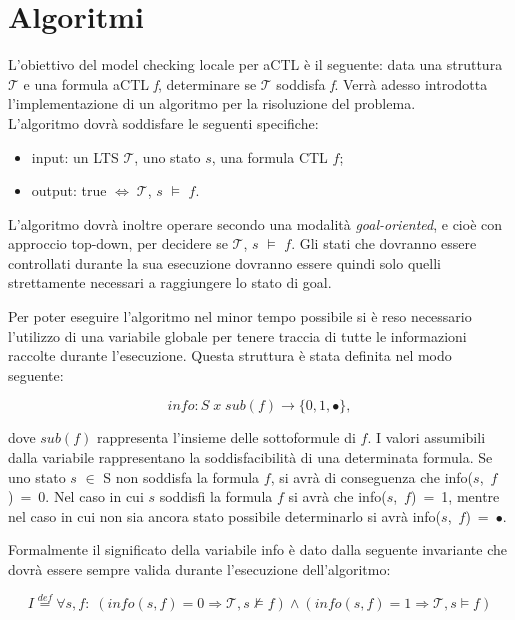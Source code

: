 \section{Algoritmi}

L'obiettivo del model checking locale per aCTL è il seguente: data una struttura $\mathcal{T}$ e una formula aCTL \emph{f},  determinare se $\mathcal{T}$ soddisfa \emph{f}.
Verrà adesso introdotta l'implementazione di un algoritmo per la risoluzione del problema.
\\

\noindent L'algoritmo dovrà soddisfare le seguenti specifiche:
\begin{itemize}
\item input: un LTS $\mathcal{T}$, uno stato $s$, una formula CTL $f$;
\item output: true $ \Leftrightarrow \; \mathcal{T}$, $s$ $\models$ $f$.
\end{itemize}
L'algoritmo dovrà inoltre operare secondo una modalità \textit{goal-oriented}, e cioè con approccio top-down, per decidere se $\mathcal{T}$, $s$ $\models$ $f$. Gli stati che dovranno essere controllati durante la sua esecuzione dovranno essere quindi solo quelli strettamente necessari a raggiungere lo stato di goal.


Per poter eseguire l'algoritmo nel minor tempo possibile si è reso necessario l'utilizzo di una variabile globale per tenere traccia di tutte le informazioni raccolte durante l'esecuzione.
Questa struttura è stata definita nel modo seguente:

\begin{equation}
info: S \; x \; sub(f) \rightarrow \lbrace 0, 1, \bullet \rbrace,
\end{equation}

dove $sub(f)$ rappresenta l'insieme delle sottoformule di $f$.
I valori assumibili dalla variabile rappresentano la soddisfacibilità di una determinata formula.
Se uno stato $s$ $\in$ S non soddisfa la formula $f$, si avrà di conseguenza che \mbox{info($s$, $f$) = 0}. Nel caso in cui $s$ soddisfi la formula $f$ si avrà che \mbox{info($s$, $f$) = 1}, mentre nel caso in cui non sia ancora stato possibile determinarlo si avrà  \mbox{info($s$, $f$) = $\bullet$}.

Formalmente il significato della variabile info è dato dalla seguente invariante che dovrà essere sempre valida durante l'esecuzione dell'algoritmo:

\begin{equation}
I \stackrel{def}{=} \forall s,f: \; (info(s, f) = 0 \Rightarrow \mathcal{T}, s \nvDash  f)  \wedge (info(s, f) = 1  \Rightarrow \mathcal{T},s \models f)
\end{equation}

